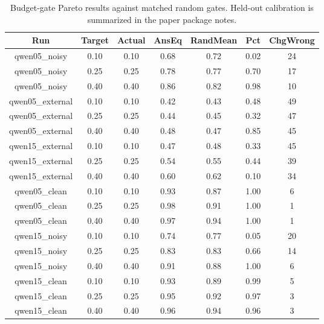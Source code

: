 \begin{table}[t]
\centering
\footnotesize
\begin{adjustbox}{max width=\textwidth}
\begin{tabular}{ccccccc}
\toprule
Run & Target & Actual & AnsEq & RandMean & Pct & ChgWrong \\
\midrule
qwen05\_noisy & 0.10 & 0.10 & 0.68 & 0.72 & 0.02 & 24 \\
qwen05\_noisy & 0.25 & 0.25 & 0.78 & 0.77 & 0.70 & 17 \\
qwen05\_noisy & 0.40 & 0.40 & 0.86 & 0.82 & 0.98 & 10 \\
qwen05\_external & 0.10 & 0.10 & 0.42 & 0.43 & 0.48 & 49 \\
qwen05\_external & 0.25 & 0.25 & 0.44 & 0.45 & 0.32 & 47 \\
qwen05\_external & 0.40 & 0.40 & 0.48 & 0.47 & 0.85 & 45 \\
qwen15\_external & 0.10 & 0.10 & 0.47 & 0.48 & 0.33 & 45 \\
qwen15\_external & 0.25 & 0.25 & 0.54 & 0.55 & 0.44 & 39 \\
qwen15\_external & 0.40 & 0.40 & 0.60 & 0.62 & 0.10 & 34 \\
qwen05\_clean & 0.10 & 0.10 & 0.93 & 0.87 & 1.00 & 6 \\
qwen05\_clean & 0.25 & 0.25 & 0.98 & 0.91 & 1.00 & 1 \\
qwen05\_clean & 0.40 & 0.40 & 0.97 & 0.94 & 1.00 & 1 \\
qwen15\_noisy & 0.10 & 0.10 & 0.74 & 0.77 & 0.05 & 20 \\
qwen15\_noisy & 0.25 & 0.25 & 0.83 & 0.83 & 0.66 & 14 \\
qwen15\_noisy & 0.40 & 0.40 & 0.91 & 0.88 & 1.00 & 6 \\
qwen15\_clean & 0.10 & 0.10 & 0.93 & 0.89 & 0.99 & 5 \\
qwen15\_clean & 0.25 & 0.25 & 0.95 & 0.92 & 0.97 & 3 \\
qwen15\_clean & 0.40 & 0.40 & 0.96 & 0.94 & 0.96 & 3 \\
\bottomrule
\end{tabular}
\end{adjustbox}
\caption{Budget-gate Pareto results against matched random gates. Held-out calibration is summarized in the paper package notes.}
\label{tab:budget}\end{table}
